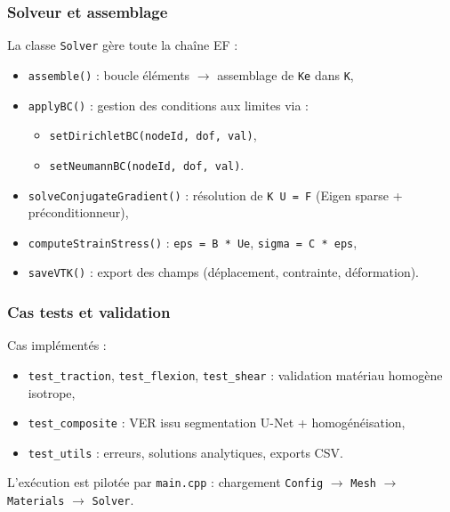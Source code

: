 \documentclass[a4paper,11pt]{article}
\begin{document}
\subsubsection*{Solveur et assemblage}

La classe \texttt{Solver} gère toute la chaîne EF :

\begin{itemize}
    \item[$\bullet$] \texttt{assemble()} :
    boucle éléments $\rightarrow$ assemblage de \texttt{Ke} dans \texttt{K},
    \item[$\bullet$] \texttt{applyBC()} :
    gestion des conditions aux limites via :
    \begin{itemize}
        \item[$\circ$] \texttt{setDirichletBC(nodeId, dof, val)},
        \item[$\circ$] \texttt{setNeumannBC(nodeId, dof, val)}.
    \end{itemize}
    \item[$\bullet$] \texttt{solveConjugateGradient()} :
    résolution de \texttt{K U = F} (Eigen sparse + préconditionneur),
    \item[$\bullet$] \texttt{computeStrainStress()} :
    \texttt{eps = B * Ue}, \texttt{sigma = C * eps},
    \item[$\bullet$] \texttt{saveVTK()} :
    export des champs (déplacement, contrainte, déformation).
\end{itemize}

\subsubsection*{Cas tests et validation}

Cas implémentés :

\begin{itemize}
    \item[$\bullet$] \texttt{test\_traction}, \texttt{test\_flexion}, \texttt{test\_shear} :
    validation matériau homogène isotrope,
    \item[$\bullet$] \texttt{test\_composite} :
    VER issu segmentation U-Net + homogénéisation,
    \item[$\bullet$] \texttt{test\_utils} :
    erreurs, solutions analytiques, exports CSV.
\end{itemize}

L’exécution est pilotée par \texttt{main.cpp} :
chargement \texttt{Config} $\rightarrow$ \texttt{Mesh} $\rightarrow$ \texttt{Materials} $\rightarrow$ \texttt{Solver}.
\end{document}
